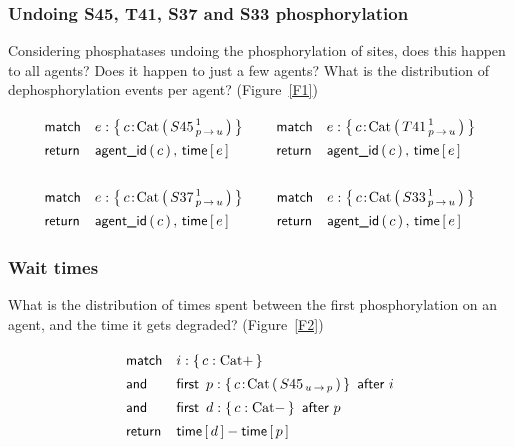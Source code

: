 
\subsubsection*{Undoing S45, T41, S37 and S33 phosphorylation}
Considering phosphatases undoing the phosphorylation of
sites, does this happen to all agents? Does it happen to just a few agents? What is the distribution of dephosphorylation events per agent? (Figure~\ref{F1})





\newcommand{\UndoQ}[1]{
\Query{
    \m{match} & e:\Set{ 
      \iAG{c}{\BetaCat}{{#1}^{\,1}_{\Trans{p}{u}}}
    } \\
    \m{return} & \AgentId{c},\, \Time{e}
  }
}

\begin{small}
  \begin{equation*}
    \arraycolsep=7pt
    \begin{array}{cc}
      \UndoQ{S45} & \UndoQ{T41} \\ \\
      \UndoQ{S37} & \UndoQ{S33} \\
    \end{array}
  \end{equation*}
\end{small}


\subsubsection*{Wait times}

What is the distribution of times spent
between the first phosphorylation on an agent, and the time it gets
degraded? (Figure~\ref{F2})


\begin{small}
\begin{equation}
  \Query{
    \m{match} & i:\Set{  c:\BetaCat+ } \\
    \m{and} & \FirstAfter{p:\Set{
        \iAG{c}{\BetaCat}{{S45}_{\Trans{u}{p}}}
    }}{i} \\
    \m{and} & \FirstAfter{ d:\Set{
        c:\BetaCat-
    } }{p} \\
    \m{return} & \Time{d} - \Time{p}
  } 
\end{equation}
\end{small}


